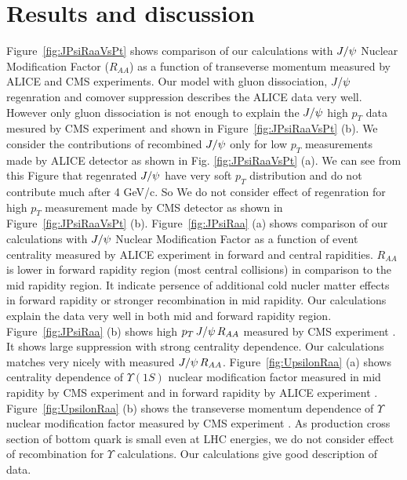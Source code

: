 \documentclass[aps,prc,preprint,superscriptaddress,showpacs,showkeys]{revtex4-1}
\begin{document}
\section{Results and discussion}
Figure~\ref{fig:JPsiRaaVsPt} shows comparison of our calculations with $J/\psi$ Nuclear Modification Factor ($R_{AA}$) as a 
function of transeverse momentum measured by ALICE \cite{ALICEJPsi} and CMS \cite{CMSJPsi} experiments.
 Our model with gluon dissociation, $J/\psi$ regenration and comover suppression describes the ALICE data very well. 
However only gluon dissociation is not enough to explain the $J/\psi$ high $p_{T}$ data mesured by CMS experiment and
shown in Figure~\ref{fig:JPsiRaaVsPt} (b). We consider the contributions of recombined $J/\psi$ only for low $p_{T}$ 
measurements made by ALICE detector as shown in Fig. \ref{fig:JPsiRaaVsPt} (a). We can see from this Figure 
that regenrated $J/\psi$ have very soft $p_{T}$ distribution and do not contribute much after 4 GeV/c. 
So We do not consider effect of regenration for high $p_{T}$ measurement made by CMS detector as shown in 
Figure~\ref{fig:JPsiRaaVsPt} (b). 
Figure~\ref{fig:JPsiRaa} (a) shows comparison of our calculations with $J/\psi$ 
Nuclear Modification Factor as a function of event centrality measured by ALICE \cite{ALICEJPsi}
experiment in forward and central rapidities. $R_{AA}$ is lower in forward rapidity region (most central collisions) 
in comparison to the mid rapidity region. It indicate persence of additional cold nucler matter effects in forward 
rapidity or stronger recombination in mid rapidity. Our calculations explain the data very well in both mid and
forward rapidity region.
Figure~\ref{fig:JPsiRaa} (b) shows high $p_{T}\,J/\psi\,R_{AA}$ measured by CMS experiment \cite{CMSJPs}.
It shows large suppression with strong centrality dependence. Our calculations matches very nicely with 
measured $J/\psi\,R_{AA}$. 
Figure~\ref{fig:UpsilonRaa} (a) shows centrality dependence of $\Upsilon(1S)$ nuclear modification factor
measured in mid rapidity by CMS experiment\cite{CMSUpsilon2} and in forward rapidity by ALICE experiment 
\cite{ALICEUpsilon}. Figure~\ref{fig:UpsilonRaa} (b) shows the transeverse momentum dependence of 
$\Upsilon$ nuclear modification factor measured by CMS experiment \cite{JCMS}. As production cross section of 
bottom quark is small even at LHC energies, we do not consider effect of recombination for $\Upsilon$ calculations.
Our calculations give good description of data.

\end{document}
